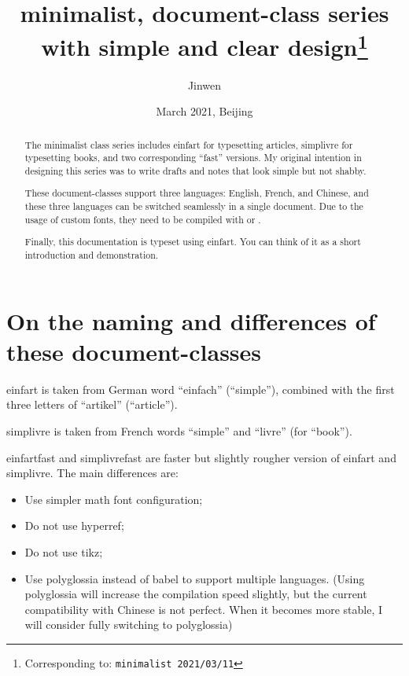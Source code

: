 \documentclass{einfart}
\providecommand{\minimalist}{\textsf{minimalist}}
\providecommand{\einfart}{\textsf{einfart}}
\providecommand{\einfartfast}{\textsf{einfartfast}}
\providecommand{\simplivre}{\textsf{simplivre}}
\providecommand{\simplivrefast}{\textsf{simplivrefast}}
\begin{document}
\title{\minimalist{}, document-class series with simple and clear design\thanks{Corresponding to: \texttt{\minimalist{} 2021/03/11}}}
\author{Jinwen}
\date{March 2021, Beijing}

\maketitle

\begin{abstract}
    The \minimalist{} class series includes \einfart{} for typesetting articles, \simplivre{} for typesetting books, and two corresponding ``fast'' versions. My original intention in designing this series was to write drafts and notes that look simple but not shabby.

    These document-classes support three languages: English, French, and Chinese, and these three languages can be switched seamlessly in a single document. Due to the usage of custom fonts, they need to be compiled with  or .
    
    Finally, this documentation is typeset using \einfart{}. You can think of it as a short introduction and demonstration.
\end{abstract}

\tableofcontents

\section{On the naming and differences of these document-classes}
\einfart{} is taken from German word ``einfach'' (``simple''), combined with the first three letters of ``artikel'' (``article'').

\simplivre{} is taken from French words ``simple'' and ``livre'' (for ``book'').

\einfartfast{} and \simplivrefast{} are faster but slightly rougher version of \einfart{} and \simplivre{}. The main differences are:
\begin{itemize}
    \item Use simpler math font configuration; 
    \item Do not use hyperref; 
    \item Do not use tikz; 
    \item Use polyglossia instead of babel to support multiple languages. (Using polyglossia will increase the compilation speed slightly, but the current compatibility with Chinese is not perfect. When it becomes more stable, I will consider fully switching to polyglossia)
\end{itemize}
\end{document}
